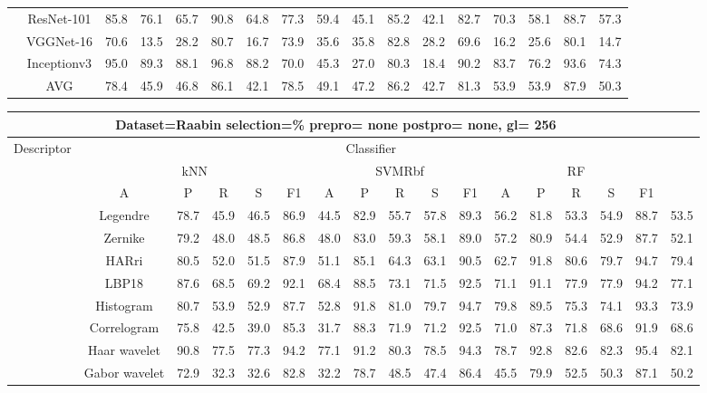 \documentclass[12pt,italian]{article}
\begin{document}
\begin{tiny}
\begin{longtable}{lcccccccccccccccc}
& ResNet-101 & 85.8 & 76.1 & 65.7 & 90.8 & 64.8 & 77.3 & 59.4 & 45.1 & 85.2 & 42.1 & 82.7 & 70.3 & 58.1 & 88.7 & 57.3 \\ 
& VGGNet-16 & 70.6 & 13.5 & 28.2 & 80.7 & 16.7 & 73.9 & 35.6 & 35.8 & 82.8 & 28.2 & 69.6 & 16.2 & 25.6 & 80.1 & 14.7 \\ 
& Inceptionv3 & 95.0 & 89.3 & 88.1 & 96.8 & 88.2 & 70.0 & 45.3 & 27.0 & 80.3 & 18.4 & 90.2 & 83.7 & 76.2 & 93.6 & 74.3 \\ 
\hline
& AVG & 78.4 & 45.9 & 46.8 & 86.1 & 42.1 & 78.5 & 49.1 & 47.2 & 86.2 & 42.7 & 81.3 & 53.9 & 53.9 & 87.9 & 50.3 \\ 
\hline
\bottomrule
\end{longtable} 

 \pagebreak 
\begin{longtable}{lcccccccccccccccc}
\toprule
\multicolumn{16}{c}{Dataset=Raabin selection=\% prepro= none postpro= none, gl= 256} \\ 
\toprule
Descriptor & \multicolumn{15}{c}{Classifier} \\ 
& \multicolumn{5}{c}{kNN} & \multicolumn{5}{c}{SVMRbf} & \multicolumn{5}{c}{RF} \\ 
& A & P & R & S & F1 & A & P & R & S & F1 & A & P & R & S & F1 \\ 
\midrule
& Legendre & 78.7 & 45.9 & 46.5 & 86.9 & 44.5 & 82.9 & 55.7 & 57.8 & 89.3 & 56.2 & 81.8 & 53.3 & 54.9 & 88.7 & 53.5 \\ 
& Zernike & 79.2 & 48.0 & 48.5 & 86.8 & 48.0 & 83.0 & 59.3 & 58.1 & 89.0 & 57.2 & 80.9 & 54.4 & 52.9 & 87.7 & 52.1 \\ 
& HARri & 80.5 & 52.0 & 51.5 & 87.9 & 51.1 & 85.1 & 64.3 & 63.1 & 90.5 & 62.7 & 91.8 & 80.6 & 79.7 & 94.7 & 79.4 \\ 
& LBP18 & 87.6 & 68.5 & 69.2 & 92.1 & 68.4 & 88.5 & 73.1 & 71.5 & 92.5 & 71.1 & 91.1 & 77.9 & 77.9 & 94.2 & 77.1 \\ 
& Histogram & 80.7 & 53.9 & 52.9 & 87.7 & 52.8 & 91.8 & 81.0 & 79.7 & 94.7 & 79.8 & 89.5 & 75.3 & 74.1 & 93.3 & 73.9 \\ 
& Correlogram & 75.8 & 42.5 & 39.0 & 85.3 & 31.7 & 88.3 & 71.9 & 71.2 & 92.5 & 71.0 & 87.3 & 71.8 & 68.6 & 91.9 & 68.6 \\ 
& Haar wavelet & 90.8 & 77.5 & 77.3 & 94.2 & 77.1 & 91.2 & 80.3 & 78.5 & 94.3 & 78.7 & 92.8 & 82.6 & 82.3 & 95.4 & 82.1 \\ 
& Gabor wavelet & 72.9 & 32.3 & 32.6 & 82.8 & 32.2 & 78.7 & 48.5 & 47.4 & 86.4 & 45.5 & 79.9 & 52.5 & 50.3 & 87.1 & 50.2 \\ 

\end{longtable}
\end{tiny}
\end{document}

